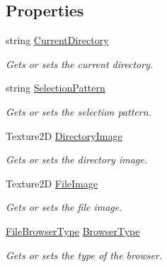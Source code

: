 \subsection*{Properties}
\begin{DoxyCompactItemize}
\item 
string \hyperlink{class_lerp2_a_p_i_1_1_utility_1_1_file_browser_a13ab9edf83c7ee4b91547f042a6992ce}{Current\+Directory}
\begin{DoxyCompactList}\small\item\em Gets or sets the current directory. \end{DoxyCompactList}\item 
string \hyperlink{class_lerp2_a_p_i_1_1_utility_1_1_file_browser_a738b0c6ce363d00f70f18e700023822f}{Selection\+Pattern}
\begin{DoxyCompactList}\small\item\em Gets or sets the selection pattern. \end{DoxyCompactList}\item 
Texture2D \hyperlink{class_lerp2_a_p_i_1_1_utility_1_1_file_browser_a51b0685a6c48727878eeb16fe81ff065}{Directory\+Image}
\begin{DoxyCompactList}\small\item\em Gets or sets the directory image. \end{DoxyCompactList}\item 
Texture2D \hyperlink{class_lerp2_a_p_i_1_1_utility_1_1_file_browser_a63c81cbca43f8e383a17f9bf26924779}{File\+Image}
\begin{DoxyCompactList}\small\item\em Gets or sets the file image. \end{DoxyCompactList}\item 
\hyperlink{namespace_lerp2_a_p_i_1_1_utility_af5d628470963cc0f18c37055b4170bf1}{File\+Browser\+Type} \hyperlink{class_lerp2_a_p_i_1_1_utility_1_1_file_browser_aed8a52cae6780a987340e6b6f9863aec}{Browser\+Type}
\begin{DoxyCompactList}\small\item\em Gets or sets the type of the browser. \end{DoxyCompactList}\item 

\end{DoxyCompactItemize}
